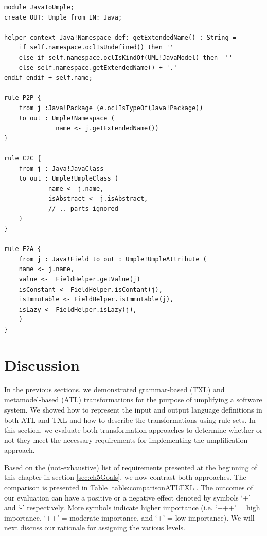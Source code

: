 \begin{lstlisting}[style=atl, label=lst:atlrules, caption=ATL transformation rules]
module JavaToUmple;
create OUT: Umple from IN: Java;

helper context Java!Namespace def: getExtendedName() : String = 
	if self.namespace.oclIsUndefined() then '' 	
	else if self.namespace.oclIsKindOf(UML!JavaModel) then 	'' 
	else self.namespace.getExtendedName() + '.'
endif endif + self.name;

rule P2P { 
	from j :Java!Package (e.oclIsTypeOf(Java!Package)) 	
	to out : Umple!Namespace ( 		
			  name <- j.getExtendedName())
}

rule C2C { 	
	from j : Java!JavaClass 	
	to out : Umple!UmpleClass ( 	
			name <- j.name, 	
			isAbstract <- j.isAbstract,      
			// .. parts ignored		
	)
}

rule F2A { 	
	from j : Java!Field to out : Umple!UmpleAttribute ( 		
	name <- j.name,
	value <-  FieldHelper.getValue(j) 	
	isConstant <- FieldHelper.isContant(j), 		
	isImmutable <- FieldHelper.isImmutable(j), 		
	isLazy <- FieldHelper.isLazy(j),
	)
}

\end{lstlisting}

\section{Discussion}

In the previous sections, we demonstrated grammar-based (TXL) and metamodel-based (ATL) transformations for the purpose of umplifying a software system. We showed how to represent the input and output language definitions in both ATL and TXL and how to describe the transformations using rule sets. In this section, we evaluate both transformation approaches to determine whether or not they meet the necessary requirements for implementing the umplification approach. 

Based on the (not-exhaustive) list of requirements presented at the beginning of this chapter in section \ref{sec:ch5Goals}, we now contrast both approaches. The comparison is presented in Table \ref{table:comparisonATLTXL}. The outcomes of our evaluation can have a positive or a negative effect denoted by symbols `+' and `-' respectively. More symbols indicate higher importance  (i.e.  `+++' = high importance, `++' = moderate importance, and `+' = low importance). We will next discuss our rationale for assigning the various levels.

